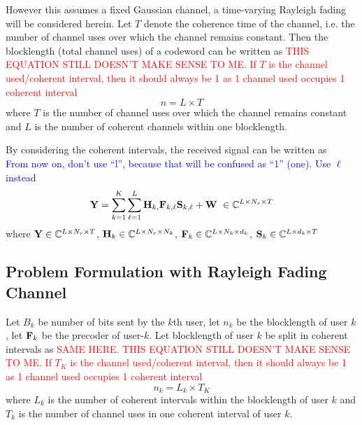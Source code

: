 \documentclass[a4paper, 12pt, onecolumn, journal, twoside, draftclsnofoot]{IEEEtran}
\begin{document}
However this assumes a fixed Gaussian channel, a time-varying Rayleigh fading will be considered herein. Let $T$ denote the coherence time of the channel, i.e. the number of channel uses over which the channel remains constant.  Then the blocklength (total channel uses) of a codeword can be written as
\textcolor{red}{THIS EQUATION STILL DOESN'T MAKE SENSE TO ME.  If $T$ is the channel used/coherent interval, then it should always be 1 as 1 channel used occupies 1 coherent interval}
\begin{equation*}
	n = L \times T
\end{equation*}
where $T$ is the number of channel uses over which the channel remains constant and $L$ is the number of coherent channels within one blocklength.

By considering the coherent intervals, the received signal can be written as \\
\textcolor{blue}{From now on, don't use ``l'', because that will be confused as ``1'' (one).  Use $\ell$ instead}
\begin{equation*}
	{\bf Y} = \sum_{k=1}^K \sum_{\ell = 1}^L {\bf H}_{k, } {\bf F}_{k, \ell}  {\bf S}_{k, \ell} + {\bf W} \ \in \mathbb{C}^{L \times N_r \times T}
\end{equation*}
where ${\bf Y} \in \mathbb{C}^{L \times N_r \times T}$, ${\bf H}_k \in \mathbb{C}^{L \times N_r \times N_k}$, ${\bf F}_k \in \mathbb{C}^{L \times N_k \times d_k}$, ${\bf S}_k \in \mathbb{C}^{L \times d_k \times T}$


\subsection{Problem Formulation with Rayleigh Fading Channel}
Let $B_k$ be number of bits sent by the $k$th user, let $n_k$ be the blocklength of user $k$, let ${\bf F}_k$ be the precoder of user-$k$.  Let blocklength of user $k$ be split in coherent intervals as 
\textcolor{red}{SAME HERE. THIS EQUATION STILL DOESN'T MAKE SENSE TO ME.  If $T_K$ is the channel used/coherent interval, then it should always be 1 as 1 channel used occupies 1 coherent interval}
\begin{equation*}
	n_k = L_k \times T_K
\end{equation*}
where $L_k$ is the number of coherent intervals within the blocklength of user $k$ and $T_k$ is the number of channel uses in one coherent interval of user $k$.
\end{document}
